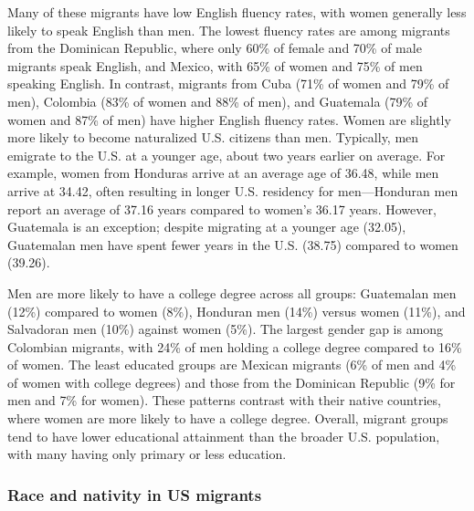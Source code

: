 \documentclass[
]{article}
\begin{document}
Many of these migrants have low English fluency rates, with women
generally less likely to speak English than men. The lowest fluency
rates are among migrants from the Dominican Republic, where only 60\% of
female and 70\% of male migrants speak English, and Mexico, with 65\% of
women and 75\% of men speaking English. In contrast, migrants from Cuba
(71\% of women and 79\% of men), Colombia (83\% of women and 88\% of
men), and Guatemala (79\% of women and 87\% of men) have higher English
fluency rates. Women are slightly more likely to become naturalized U.S.
citizens than men. Typically, men emigrate to the U.S. at a younger age,
about two years earlier on average. For example, women from Honduras
arrive at an average age of 36.48, while men arrive at 34.42, often
resulting in longer U.S. residency for men---Honduran men report an
average of 37.16 years compared to women's 36.17 years. However,
Guatemala is an exception; despite migrating at a younger age (32.05),
Guatemalan men have spent fewer years in the U.S. (38.75) compared to
women (39.26).

Men are more likely to have a college degree across all groups:
Guatemalan men (12\%) compared to women (8\%), Honduran men (14\%)
versus women (11\%), and Salvadoran men (10\%) against women (5\%). The
largest gender gap is among Colombian migrants, with 24\% of men holding
a college degree compared to 16\% of women. The least educated groups
are Mexican migrants (6\% of men and 4\% of women with college degrees)
and those from the Dominican Republic (9\% for men and 7\% for women).
These patterns contrast with their native countries, where women are
more likely to have a college degree. Overall, migrant groups tend to
have lower educational attainment than the broader U.S. population, with
many having only primary or less education.

\subsubsection{Race and nativity in US
migrants}\label{race-and-nativity-in-us-migrants}
\end{document}
